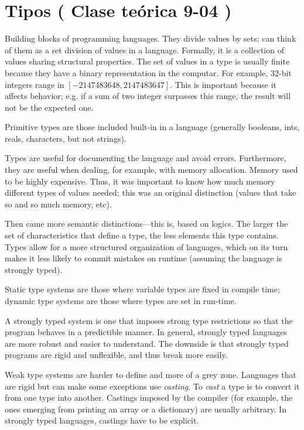 \documentclass[a4paper, 12pt]{article}
\begin{document}
\section{Tipos ( Clase teórica 9-04 )}

Building blocks of programming languages. They divide values by sets; can think
of them as a set division of values in a language. Formally, it is a collection
of values sharing structural properties. The set of values in a type is usually
finite because they have a binary representation in the computar. For example,
32-bit integers range in $[-2147483648, 2147483647]$. This is important because
it affects behavior; e.g. if a sum of two integer surpasses this range, the
result will not be the expected one.

Primitive types are those included built-in in a language (generally booleans, ints, reals, 
characters, but not strings). 

Types are useful for documenting the language and avoid errors. Furthermore,
they are useful when dealing, for example, with memory allocation. Memory used
to be highly expensive. Thus, it was important to know how much memory
different types of values needed; this was an original distinction (values that
take so and so much memory, etc).

Then came more semantic distinctions---this is, based on logics. The larger the
set of characteristics that define a type, the less elements this type
contains. Types allow for a more structured organization of languages, which on
its turn makes it less likely to commit mistakes on runtime (assuming the
language is strongly typed).

Static type systems are those where variable types are fixed in compile time;
dynamic type systems are those where types are set in run-time.

A strongly typed system is one that imposes strong type restrictions so that
the program behaves in a predictible manner. In general, strongly typed
languages are more robust and easier to understand. The downside is that
strongly typed programs are rigid and unflexible, and thus break more easily.

Weak type systems are harder to define and more of a grey zone. Languages that
are rigid but can make some exceptions use \textit{casting}. To \textit{cast} a
type is to convert it from one type into another. Castings imposed by the
compiler (for example, the ones emerging from printing an array or a
dictionary) are usually arbitrary. In strongly typed languages, castings have
to be explicit.
\end{document}
